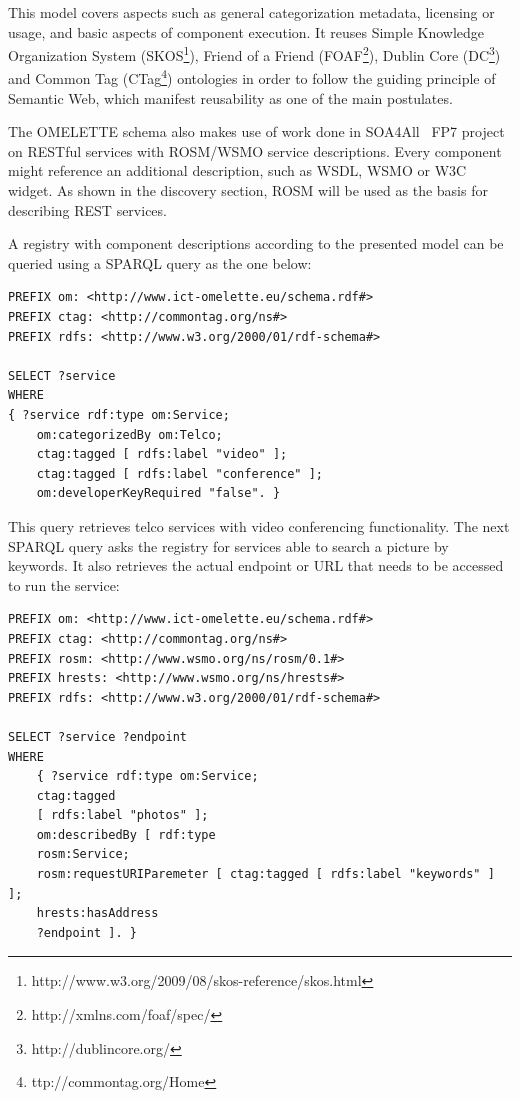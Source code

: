 This model covers aspects such as general categorization metadata, licensing or usage, and basic aspects of component execution. It reuses Simple Knowledge Organization System (SKOS\footnote{http://www.w3.org/2009/08/skos-reference/skos.html}), Friend of a Friend (FOAF\footnote{http://xmlns.com/foaf/spec/}), Dublin Core (DC\footnote{http://dublincore.org/}) and Common Tag (CTag\footnote{ttp://commontag.org/Home}) ontologies in order to follow the guiding principle of Semantic Web, which manifest reusability
as one of the main postulates.

The OMELETTE schema also makes use of work done in SOA4All~\cite{soa4all} FP7 project on RESTful services with ROSM/WSMO service descriptions. Every component might reference an additional description, such as WSDL, WSMO or W3C widget. As shown in the discovery section, ROSM will be used as the basis for describing REST services.

A registry with component descriptions according to the presented model can be queried using a SPARQL query as the one below:

\begin{lstlisting}[style=consola,caption={Example SPARQL}]
PREFIX om: <http://www.ict-omelette.eu/schema.rdf#>
PREFIX ctag: <http://commontag.org/ns#>
PREFIX rdfs: <http://www.w3.org/2000/01/rdf-schema#>

SELECT ?service
WHERE
{ ?service rdf:type om:Service;
	om:categorizedBy om:Telco;
	ctag:tagged [ rdfs:label "video" ];
	ctag:tagged [ rdfs:label "conference" ];
	om:developerKeyRequired "false". }
\end{lstlisting}

This query retrieves telco services with video conferencing functionality. The next SPARQL query asks the registry for services able to search a picture by keywords. It also retrieves the actual endpoint or URL that needs to be accessed to run the service:

\begin{lstlisting}[style=consola,caption={Example SPARQL keywords}]
PREFIX om: <http://www.ict-omelette.eu/schema.rdf#>
PREFIX ctag: <http://commontag.org/ns#>
PREFIX rosm: <http://www.wsmo.org/ns/rosm/0.1#>
PREFIX hrests: <http://www.wsmo.org/ns/hrests#>
PREFIX rdfs: <http://www.w3.org/2000/01/rdf-schema#>

SELECT ?service ?endpoint
WHERE
	{ ?service rdf:type om:Service;
	ctag:tagged
	[ rdfs:label "photos" ];
	om:describedBy [ rdf:type
	rosm:Service;
	rosm:requestURIParemeter [ ctag:tagged [ rdfs:label "keywords" ] ];
	hrests:hasAddress
	?endpoint ]. }
\end{lstlisting}


